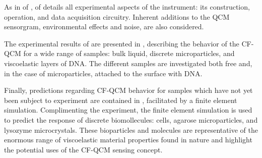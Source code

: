 As in  of ,
 of  details all experimental
aspects of the instrument: its construction, operation, and data
acquisition circuitry.  Inherent additions to the QCM sensorgram, 
environmental effects and noise, are also considered.

The experimental results of  are presented in
, describing the behavior of the CF-QCM for a
wide range of samples: bulk liquid, discrete microparticles, and
viscoelastic layers of DNA\@.  The different samples are investigated both
free and, in the case of microparticles, attached to the surface with
DNA\@.

Finally, predictions regarding CF-QCM behavior for samples which have not yet
been subject to experiment are contained in ,
facilitated by a finite element simulation.  Complimenting the experiment, the
finite element simulation is used to predict the response of discrete
biomollecules: cells, agarose microparticles, and lysozyme microcrystals.
These bioparticles and molecules are representative of the enormous range of
viscoelastic material properties found in nature and highlight the potential
uses of the CF-QCM sensing concept.
